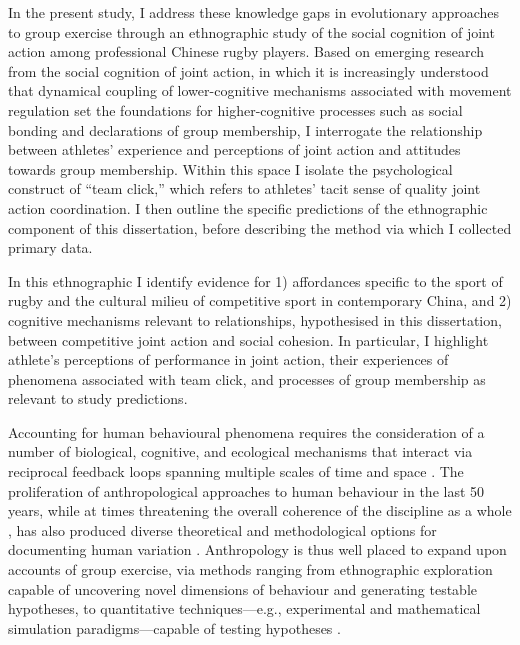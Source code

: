   In the present study, I address these knowledge gaps in evolutionary approaches to group exercise through an ethnographic study of the social cognition of joint action among professional Chinese rugby players.  Based on emerging research from the social cognition of joint action, in which it is increasingly understood that dynamical coupling of lower-cognitive mechanisms associated with movement regulation set the foundations for higher-cognitive processes such as social bonding and declarations of group membership, I interrogate the relationship between athletes' experience and perceptions of joint action and attitudes towards group membership.  Within this space I isolate the psychological construct of ``team click,'' which refers to athletes' tacit sense of quality joint action coordination.   I then outline the specific predictions of the ethnographic component of this dissertation, before describing the method via which I collected primary data.


  In this ethnographic I identify evidence for 1) affordances specific to the sport of rugby and the cultural milieu of competitive sport in contemporary China, and 2) cognitive mechanisms relevant to relationships, hypothesised in this dissertation, between competitive joint action and social cohesion.  In particular, I highlight athlete's perceptions of performance in joint action, their experiences of phenomena associated with team click, and processes of group membership as relevant to study predictions.

  Accounting for human behavioural phenomena requires the consideration of a number of biological, cognitive, and ecological mechanisms that interact via reciprocal feedback loops spanning multiple scales of time and space \citep{Fuentes2015}.
  The proliferation of anthropological approaches to human behaviour in the last 50 years, while at times threatening the overall coherence of the discipline as a whole \citep{Beller2012}, has also produced diverse theoretical and methodological options for documenting human variation \citep{Fuentes2016a}.
  Anthropology is thus well placed to expand upon accounts of group exercise, via methods ranging from ethnographic exploration capable of uncovering novel dimensions of behaviour and generating testable hypotheses, to quantitative techniques---e.g., experimental and mathematical simulation paradigms---capable of testing hypotheses \citep{Epstein2006,Fuentes2016}.



